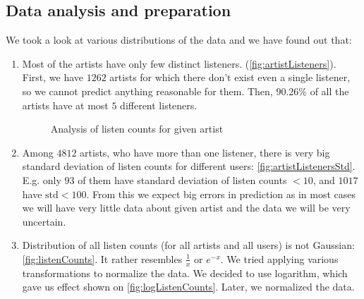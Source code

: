 \documentclass{article}
\begin{document}
\subsection*{Data analysis and preparation}
We took a look at various distributions of the data and we have found out that:
\begin{enumerate}[1.]
\item Most of the artists have only few distinct listeners. (\ref{fig:artistListeners}). First, we have $1262$ artists for which there don't exist even a single listener, so we cannot predict anything reasonable for them. Then, $90.26\%$ of all the artists have at most $5$ different listeners.
\begin{figure}[!t]
\center
{}
\hfill
{}
\caption{Analysis of listen counts for given artist}
\end{figure}
\item Among $4812$ artists, who have more than one listener, there is very big standard deviation of listen counts for different users: \ref{fig:artistListenersStd}. E.g. only $93$ of them have standard deviation of listen counts $<10$, and $1017$ have $\mbox{std} < 100$. From this we expect big errors in prediction as in most cases we will have very little data about given artist and the data we will be very uncertain.
\item Distribution of all listen counts (for all artists and all users) is not Gaussian: \ref{fig:listenCounts}. It rather resembles $\frac{1}{x}$ or $e^{-x}$. We tried applying various transformations to normalize the data. We decided to use logarithm, which gave us effect shown on \ref{fig:logListenCounts}. Later, we normalized the data.
\end{enumerate}
\end{document}
